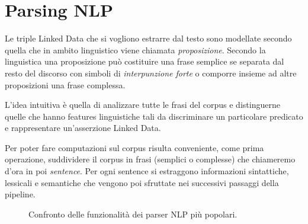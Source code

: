\section{Parsing NLP}
\label{sec:methods:parsing_nlp}

Le triple Linked Data che si vogliono estrarre dal testo sono modellate secondo quella che in ambito linguistico viene chiamata \textit{proposizione}. Secondo la linguistica una proposizione può costituire una frase semplice se separata dal resto del discorso con simboli di \textit{interpunzione forte} o comporre insieme ad altre proposizioni una frase complessa. 

L'idea intuitiva è quella di analizzare tutte le frasi del corpus e distinguerne quelle che hanno features linguistiche tali da discriminare un particolare predicato e rappresentare un'asserzione Linked Data.

Per poter fare computazioni sul corpus risulta conveniente, come prima operazione, suddividere il corpus in frasi (semplici o complesse) che chiameremo d'ora in poi \textit{sentence}. Per ogni sentence si estraggono informazioni sintattiche, lessicali e semantiche che vengono poi sfruttate nei successivi passaggi della pipeline. 

\begin{figure}[htb]
	\caption{Confronto delle funzionalità dei parser NLP più popolari.}
	\label{fig:methods:nlp_comparison}
\end{figure}

